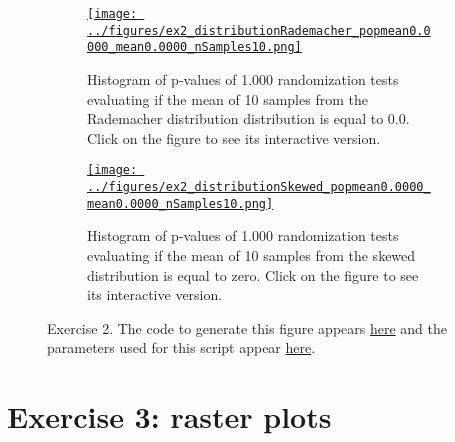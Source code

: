 \documentclass{article}
\begin{document}
\begin{figure}
    \begin{center}

        \begin{subfigure}{1.0\textwidth}
            \centering
            \href{https://www.gatsby.ucl.ac.uk/~rapela/neuroinformatics/2023/ws1/figures/ex2_distributionRademacher_popmean0.0000_mean0.0000_nSamples10.html}{\texttt{[image: ../figures/ex2\_distributionRademacher\_popmean0.0000\_mean0.0000\_nSamples10.png]}}

            \caption{Histogram of p-values of 1.000 randomization tests evaluating
            if the mean of 10 samples from the Rademacher
            distribution distribution is equal to 0.0.  Click on the
            figure to see its interactive version.}

            \label{fig:ex2_1}
        \end{subfigure}

        \begin{subfigure}{1.0\textwidth}
            \centering
            \href{https://www.gatsby.ucl.ac.uk/~rapela/neuroinformatics/2023/ws1/figures/ex2_distributionSkewed_popmean0.0000_mean0.0000_nSamples10.html}{\texttt{[image: ../figures/ex2\_distributionSkewed\_popmean0.0000\_mean0.0000\_nSamples10.png]}}

            \caption{Histogram of p-values of 1.000 randomization tests evaluating if the mean
            of 10 samples from the skewed distribution is equal to zero.
            Click on the figure to see its interactive version.}

            \label{fig:ex2_2}
        \end{subfigure}

        \caption{Exercise 2. The code to generate this figure appears
        \href{https://github.com/joacorapela/neuroinformatics23/blob/master/worksheets/ws1/mySolution/code/scripts/doEx2.py}{here}
        and the parameters used for this script appear
        \href{https://github.com/joacorapela/neuroinformatics23/blob/master/worksheets/ws1/mySolution/code/scripts/doEx2.csh}{here}.
        }

        \label{fig:ex2}

    \end{center}
\end{figure}

\section*{Exercise 3: raster plots}
\end{document}
